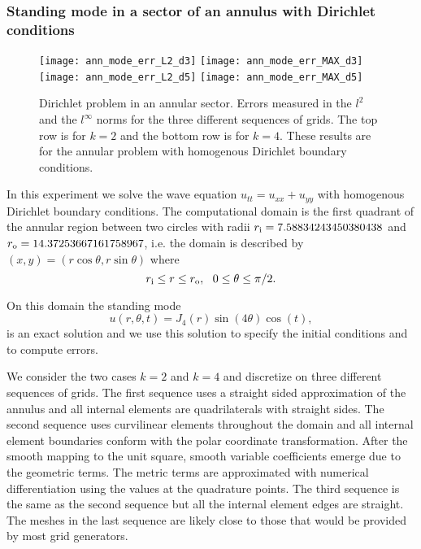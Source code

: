 \documentclass[onefignum,onetabnum]{siamart171218}
\begin{document}
\subsubsection{Standing mode in a sector of an annulus with Dirichlet conditions}  \label{sec:Dann_mode}
\begin{figure}[htb]
\begin{center}
\texttt{[image: ann\_mode\_err\_L2\_d3]}
\texttt{[image: ann\_mode\_err\_MAX\_d3]}
\texttt{[image: ann\_mode\_err\_L2\_d5]}
\texttt{[image: ann\_mode\_err\_MAX\_d5]}
\caption{Dirichlet problem in an annular sector. Errors measured in the $l^2$ and the $l^\infty$ norms for the three different sequences of grids. The top row is for $k=2$ and the bottom row is for $k=4$. These results are for the annular problem with homogenous Dirichlet boundary conditions. \label{fig:ann_mode_errs_dir}}
\end{center}
\end{figure}	

In this experiment we solve the wave equation  $u_{tt}=u_{xx}+u_{yy}$  with homogenous Dirichlet boundary conditions. The computational domain is the first quadrant of the annular region between two circles with radii $r_{\rm i}= 7.58834243450380438$ and  $r_{\rm o} = 14.37253667161758967$, i.e. the domain is described by $(x,y) = (r \cos \theta, r \sin \theta)$ where
\[
 r_{\rm i} \le r \le r_{\rm o}, \ \ 0 \le \theta \le \pi/2.
\]

On this domain the standing mode 
\[
u(r,\theta,t) = J_4(r) \sin(4\theta) \cos(t),
\] 
is an exact solution and we use this solution to specify the initial conditions and to compute errors.  

We consider the two cases $k = 2$ and $k=4$ and discretize on three different sequences of grids. The first sequence uses a straight sided approximation of the annulus  and all internal elements are quadrilaterals with straight sides. The second sequence uses curvilinear elements throughout the domain and all internal element boundaries conform with the polar coordinate transformation.  After the smooth mapping to the unit square, smooth variable coefficients emerge due to the geometric terms.  The metric terms are approximated with numerical differentiation using the values at the quadrature points. The third sequence is the same as the second sequence but all the internal element edges are straight. The meshes in the last sequence are likely close to those that would be provided by most grid generators. 
\end{document}
